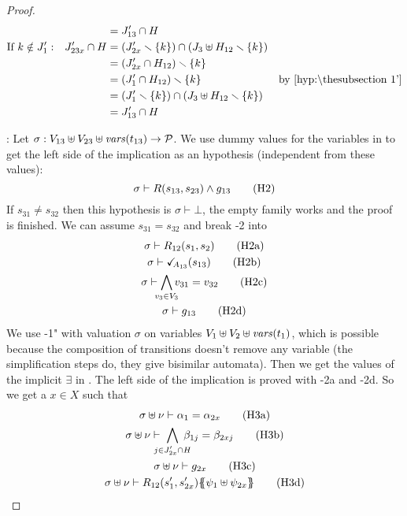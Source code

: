 \documentclass{article}
\begin{document}
\begin{proof}
\begin{align*}
		&&& = J'_{13} \cap H \\
		\text{If } k \notin J'_1: && J'_{23x} \cap H & = \mpar{J'_{2x} \setminus \mbrc{k}} \cap \mpar{J_3 \uplus H_{12} \setminus \mbrc{k}} \\
		&&& = \mpar{J'_{2x} \cap H_{12}} \setminus \mbrc{k} \\
		&&& = \mpar{J'_1 \cap H_{12}} \setminus \mbrc{k} & \text{by \hyp{1'}} \\
		&&& = \mpar{J'_1 \setminus \mbrc{k}} \cap \mpar{J_3 \uplus H_{12} \setminus \mbrc{k}} \\
		&&& = J'_{13} \cap H
	\end{align*}
\item[\goal{2}:] Let \(\sigma: V_{13} \uplus V_{23} \uplus \mathit{vars}{\left(t_{13}\right)} \to \mathcal{P}\).
	We use dummy values for the variables in  to get the left side of the implication as an hypothesis (independent from these values):
	\[ \sigma \vdash R\mpar{s_{13}, s_{23}} \wedge g_{13} \hyp{2} \]
	If \(s_{31} \neq s_{32}\) then this hypothesis is \(\sigma \vdash \bot\), the empty family works and the proof is finished.
	We can assume \(s_{31} = s_{32}\) and break \hyp{2} into
	\begin{gather}
		\sigma \vdash R_{12}\mpar{s_1, s_2} \hyp{2a} \\
		\sigma \vdash \reach{A_{13}}\mpar{s_{13}} \hyp{2b} \\
		\sigma \vdash \bigwedge_\subbox{v_3 \in V_3} v_{31} = v_{32} \hyp{2c} \\
		\sigma \vdash g_{13} \hyp{2d}
	\end{gather}
	We use \hyp{1"} with valuation \(\sigma\) on variables \(V_1 \uplus V_2 \uplus \mathit{vars}{\left(t_1\right)}\), which is possible because the composition of transitions doesn't remove any variable (the simplification steps do, they give bisimilar automata).
	Then we get the values of the implicit \(\exists\) in .
	The left side of the implication is proved with \hyp{2a} and \hyp{2d}.
	So we get a \(x \in X\) such that
	\begin{gather}
		\sigma \uplus \nu \vdash \alpha_1 = \alpha_{2x} \hyp{3a} \\
		\sigma \uplus \nu \vdash \bigwedge_\subbox{j \in J'_{2x} \cap H} \beta_{1j} = \beta_{2xj} \hyp{3b} \\
		\sigma \uplus \nu \vdash g_{2x} \hyp{3c} \\
		\sigma \uplus \nu \vdash R_{12}\mpar{s'_1, s'_{2x}}\psubst{\psi_1 \uplus \psi_{2x}} \hyp{3d}
	\end{gather}

\end{proof}
\end{document}
